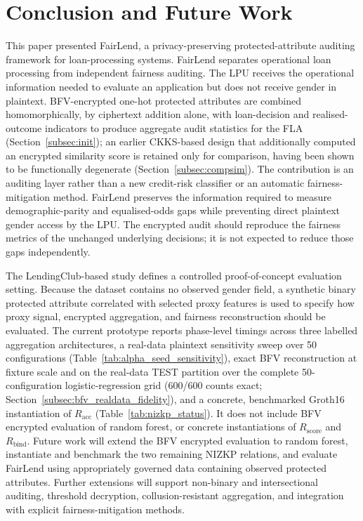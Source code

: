 \documentclass[a4paper,fleqn]{cas-dc}
\begin{document}
\section{Conclusion and Future Work} 

This paper presented FairLend, a privacy-preserving protected-attribute auditing framework for loan-processing systems. FairLend separates operational loan processing from independent fairness auditing. The LPU receives the operational information needed to evaluate an application but does not receive gender in plaintext. BFV-encrypted one-hot protected attributes are combined homomorphically, by ciphertext addition alone, with loan-decision and realised-outcome indicators to produce aggregate audit statistics for the FLA (Section~\ref{subsec:init}); an earlier CKKS-based design that additionally computed an encrypted similarity score is retained only for comparison, having been shown to be functionally degenerate (Section~\ref{subsec:compsim}). The contribution is an auditing layer rather than a new credit-risk classifier or an automatic fairness-mitigation method. FairLend preserves the information required to measure demographic-parity and equalised-odds gaps while preventing direct plaintext gender access by the LPU. The encrypted audit should reproduce the fairness metrics of the unchanged underlying decisions; it is not expected to reduce those gaps independently.

The LendingClub-based study defines a controlled proof-of-concept evaluation setting. Because the dataset contains no observed gender field, a synthetic binary protected attribute correlated with selected proxy features is used to specify how proxy signal, encrypted aggregation, and fairness reconstruction should be evaluated. The current prototype reports phase-level timings across three labelled aggregation architectures, a real-data plaintext sensitivity sweep over 50 configurations (Table~\ref{tab:alpha_seed_sensitivity}), exact BFV reconstruction at fixture scale and on the real-data TEST partition over the complete 50-configuration logistic-regression grid (600/600 counts exact; Section~\ref{subsec:bfv_realdata_fidelity}), and a concrete, benchmarked Groth16 instantiation of $R_{\mathrm{acc}}$ (Table~\ref{tab:nizkp_status}). It does not include BFV encrypted evaluation of random forest, or concrete instantiations of $R_{\mathrm{score}}$ and $R_{\mathrm{bind}}$. Future work will extend the BFV encrypted evaluation to random forest, instantiate and benchmark the two remaining NIZKP relations, and evaluate FairLend using appropriately governed data containing observed protected attributes. Further extensions will support non-binary and intersectional auditing, threshold decryption, collusion-resistant aggregation, and integration with explicit fairness-mitigation methods.
\end{document}
